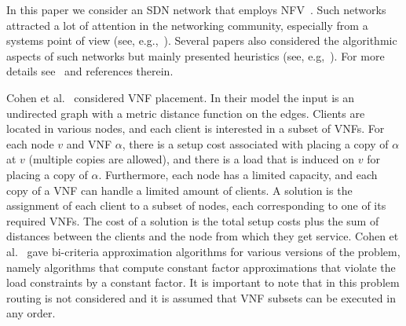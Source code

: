 In this paper we consider an SDN network that employs
NFV~\cite{SDN-NFV15}.  Such networks attracted a lot of attention in
the networking community, especially from a systems point of view
(see, e.g.,~\cite{GVPGKDA14,HVSBFTF15}).  Several papers also
considered the algorithmic aspects of such networks but mainly
presented heuristics (see, e.g,~\cite{soule2014merlin}).  For more
details see~\cite{ERS16} and references therein.

Cohen et al.~\cite{CLNR15} considered VNF placement.  In their model
the input is an undirected graph with a metric distance function on
the edges.  Clients are located in various nodes, and each client is
interested in a subset of VNFs.  For each node $v$ and VNF $\alpha$,
there is a setup cost associated with placing a copy of $\alpha$ at
$v$ (multiple copies are allowed), and there is a load that is induced
on $v$ for placing a copy of $\alpha$.  Furthermore, each node has a
limited capacity, and each copy of a VNF can handle a limited amount
of clients.  A solution is the assignment of each client to a subset
of nodes, each corresponding to one of its required VNFs.  The cost of
a solution is the total setup costs plus the sum of distances between
the clients and the node from which they get service.
%
Cohen et al.~\cite{CLNR15} gave bi-criteria approximation algorithms
for various versions of the problem, namely algorithms that compute
constant factor approximations that violate the load constraints by a
constant factor.
%
It is important to note that in this problem routing is not considered
and it is assumed that VNF subsets can be executed in any order.


